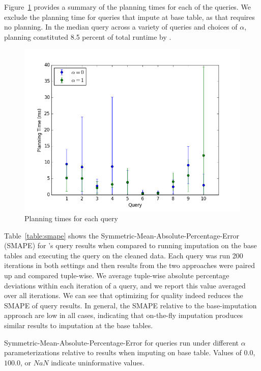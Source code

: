 Figure~\ref{fig:plantimes} provides a summary of the planning times for each of the queries.
We exclude the planning time for queries that impute at base table, as that requires no
planning. In the median query across a variety of queries and choices of $\alpha$, planning
constituted 8.5 percent of total runtime by \ProjectName{}.

\begin{figure}
\includegraphics[width=\columnwidth]{figures/planning_times_imputedb.png}
\caption{Planning times for each query}
\label{fig:plantimes}
\end{figure}

Table~\ref{table:smape} shows the Symmetric-Mean-Absolute-Percentage-Error (SMAPE) for
\ProjectName{}'s query results when compared to running imputation on the base tables and
executing the query on the cleaned data. Each query was run 200 iterations in both settings
and then results from the two approaches were paired up and compared tuple-wise. We average
tuple-wise absolute percentage deviations within each iteration of a query, and we report
this value averaged over all iterations.  We can see that optimizing for quality indeed
reduces the SMAPE of query results. In general, the SMAPE relative to the base-imputation
approach are low in all cases, indicating that on-the-fly imputation produces similar
results to imputation at the base tables.

\begin{table}
\centering

\caption{Symmetric-Mean-Absolute-Percentage-Error for queries run under different $\alpha$
    parameterizations relative to results when imputing on base table. Values of $0.0$,
    $100.0$, or $NaN$ indicate uninformative values.} %
\label{table:smape}
\end{table}

